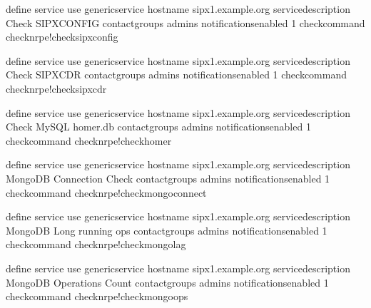 \documentclass[letterpaper,10pt,english]{sphinxmanual}
\begin{document}
\begin{sphinxVerbatim}[commandchars=\\\{\}]
define service\PYGZob{}
        use                             generic\PYGZhy{}service
        host\PYGZus{}name                       sipx1.example.org
        service\PYGZus{}description             Check SIPXCONFIG
        contact\PYGZus{}groups                  admins
        notifications\PYGZus{}enabled           1
        check\PYGZus{}command                   check\PYGZus{}nrpe!check\PYGZus{}sipxconfig
        \PYGZcb{}

define service\PYGZob{}
        use                             generic\PYGZhy{}service
        host\PYGZus{}name                       sipx1.example.org
        service\PYGZus{}description             Check SIPXCDR
        contact\PYGZus{}groups                  admins
        notifications\PYGZus{}enabled           1
        check\PYGZus{}command                   check\PYGZus{}nrpe!check\PYGZus{}sipxcdr
        \PYGZcb{}

define service\PYGZob{}
        use                             generic\PYGZhy{}service
        host\PYGZus{}name                       sipx1.example.org
        service\PYGZus{}description             Check MySQL homer.db
        contact\PYGZus{}groups                  admins
        notifications\PYGZus{}enabled           1
        check\PYGZus{}command                   check\PYGZus{}nrpe!check\PYGZus{}homer
        \PYGZcb{}

define service\PYGZob{}
        use                             generic\PYGZhy{}service
        host\PYGZus{}name                       sipx1.example.org
        service\PYGZus{}description             MongoDB Connection Check
        contact\PYGZus{}groups                  admins
        notifications\PYGZus{}enabled           1
        check\PYGZus{}command                   check\PYGZus{}nrpe!check\PYGZus{}mongo\PYGZus{}connect
        \PYGZcb{}

define service\PYGZob{}
        use                             generic\PYGZhy{}service
        host\PYGZus{}name                       sipx1.example.org
        service\PYGZus{}description             MongoDB Long running ops
        contact\PYGZus{}groups                  admins
        notifications\PYGZus{}enabled           1
        check\PYGZus{}command                   check\PYGZus{}nrpe!check\PYGZus{}mongo\PYGZus{}lag
        \PYGZcb{}

define service\PYGZob{}
        use                             generic\PYGZhy{}service
        host\PYGZus{}name                       sipx1.example.org
        service\PYGZus{}description             MongoDB Operations Count
        contact\PYGZus{}groups                  admins
        notifications\PYGZus{}enabled           1
        check\PYGZus{}command                   check\PYGZus{}nrpe!check\PYGZus{}mongo\PYGZus{}ops
        \PYGZcb{}


\end{sphinxVerbatim}
\end{document}

